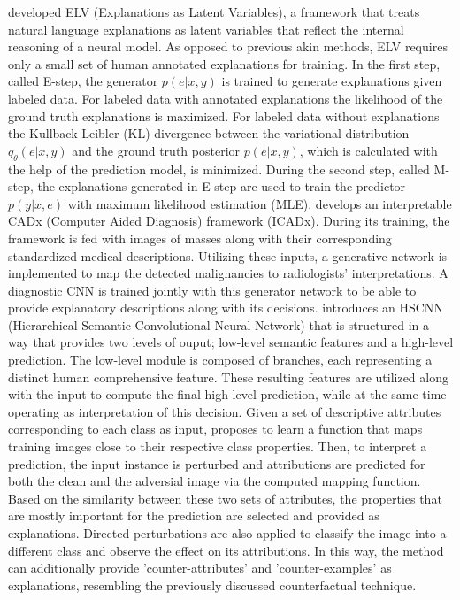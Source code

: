 \documentclass[journal]{IEEEtran}
\begin{document}
\cite{Zhou2020} developed ELV (Explanations as Latent Variables), a framework that treats natural language explanations as latent variables that reflect the internal reasoning of a neural model. As opposed to previous akin methods, ELV requires only a small set of human annotated explanations for training. In the first step, called E-step, the generator $p(e|x,y)$ is trained to generate explanations given labeled data. For labeled data with annotated explanations the likelihood of the ground truth explanations is maximized. For labeled data without explanations the Kullback-Leibler (KL) divergence between the variational distribution $q_{\theta}(e|x,y)$ and the ground truth posterior $p(e|x,y)$, which is calculated with the help of the prediction model, is minimized. During the second step, called M-step, the explanations generated in E-step are used to train the predictor $p(y|x,e)$ with maximum likelihood estimation (MLE).
\cite{Kim2018b} develops an interpretable CADx (Computer Aided Diagnosis) framework (ICADx). During its training, the framework is fed with images of masses along with their corresponding standardized medical descriptions. Utilizing these inputs, a generative network is implemented to map the detected malignancies to radiologists' interpretations. A diagnostic CNN is trained jointly with this generator network to be able to provide explanatory descriptions along with its decisions.
\cite{Shen2019} introduces an HSCNN (Hierarchical Semantic Convolutional Neural Network) that is structured in a way that provides two levels of ouput;  low-level semantic features and a high-level prediction. The low-level module is composed of branches, each representing a distinct human comprehensive feature. These resulting features are utilized along with the input to compute the final high-level prediction, while at the same time operating as interpretation of this decision.
Given a set of descriptive attributes corresponding to each class as input, \cite{Gulshad2020} proposes to learn a function that maps training images close to their respective class properties. Then, to interpret a prediction, the input instance is perturbed and attributions are predicted for both the clean and the adversial image via the computed mapping function. Based on the similarity between these two sets of attributes, the properties that are mostly important for the prediction are selected and provided as explanations. Directed perturbations are also applied to classify the image into a different class and observe the effect on its attributions. In this way, the method can additionally provide 'counter-attributes' and 'counter-examples' as explanations, resembling the previously discussed counterfactual technique.
\end{document}
